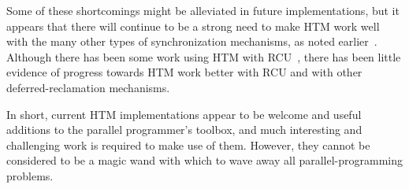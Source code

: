 Some of these shortcomings might be alleviated in future implementations,
but it appears that there will continue to be a strong need to make
HTM work well with the many other types of synchronization mechanisms,
as noted earlier~\cite{McKenney2007PLOSTM,PaulEMcKenney2010OSRGrassGreener}.
Although there has been some work using HTM with
RCU~\cite{Siakavaras2017CombiningHA,DimitriosSiakavaras2020RCU-HTM-B+Trees,ChristinaGiannoula2018HTM-RCU-graphcoloring,SeongJaePark2020HTMRCUlock},
there has been little evidence of progress towards HTM work better with
RCU and with other deferred-reclamation mechanisms.

In short, current HTM implementations appear to be welcome and useful
additions to the parallel programmer's toolbox, and much interesting
and challenging work is required to make use of them.
However, they cannot be
considered to be a magic wand with which to wave away all parallel-programming
problems.
